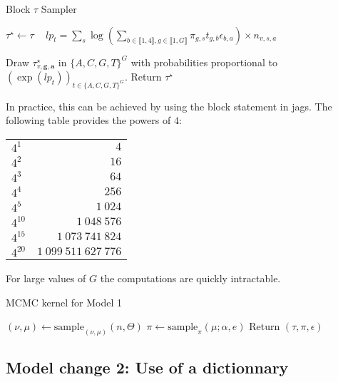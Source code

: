 \documentclass{article}
\newcommand\indexvec[1]{\mathbf{#1}}
\begin{document}
\begin{algorithm}[H]
\caption{Block $\tau$ Sampler }\label{alg:desman_tau}
\begin{algorithmic}
\State $\tau^\star\gets\tau$
  \ 
    \State   $lp_t=  \sum_{s}      \log\left(\sum_{b\in\llbracket 1,4\rrbracket,g\in\llbracket 1,G\rrbracket}\pi_{g,s}t_{g,b}\epsilon_{b,a}\right)\times n_{v,s,a}$
 \EndFor
    
    \State Draw $\tau^\star_{v,\indexvec{g},\indexvec{a}}$ in $\{A,C,G,T\}^G$ with probabilities proportional to $\left(\exp(lp_t)\right)_{t\in\{A,C,G,T\}^G}$.
 \EndFor
\State Return $\tau^\star$
\EndProcedure
\end{algorithmic}
\end{algorithm}

In practice, this can be achieved by using the block statement in jags.
The following table provides the powers of $4$:
\begin{table}[H]
\centering
\begin{tabular}{lr}
  \hline
$4^{1}$&$4$\\$4^{2}$&$16$\\$4^{3}$&$64$\\$4^{4}$&$256$\\$4^{5}$&$1~024$\\$4^{10}$&$1~048~576$\\$4^{15}$&$1~073~741~824$\\$4^{20}$&$1~099~511~627~776$\\   \hline
\end{tabular}
\end{table}
For large values of $G$ the computations are quickly intractable.
\begin{algorithm}[H]
\caption{MCMC kernel for Model 1}\label{alg:mcmck}
\begin{algorithmic}
\State $(\nu,\mu)\gets{\mathrm{sample}_{(\nu,\mu)}(n,\Theta)}$
\State $\pi\gets\mathrm{sample}_\pi(\mu;\alpha,e)$
\State Return $\left(\tau,\pi,\epsilon\right)$
\EndProcedure
\end{algorithmic}
\end{algorithm}


\subsection{Model change 2: Use of a dictionnary}
\end{document}
